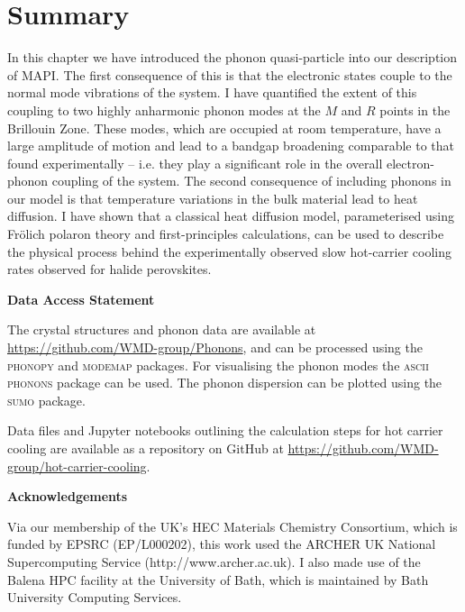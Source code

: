\section{Summary}

In this chapter we have introduced the phonon quasi-particle into our description of MAPI. The first consequence of this is that the electronic states couple to the normal mode vibrations of the system. I have quantified the extent of this coupling to two highly anharmonic phonon modes at the $M$ and $R$ points in the Brillouin Zone. These modes, which are occupied at room temperature, have a large amplitude of motion and lead to a bandgap broadening comparable to that found experimentally -- i.e. they play a significant role in the overall electron-phonon coupling of the system.
The second consequence of including phonons in our model is that temperature variations in the bulk material lead to heat diffusion. I have shown that a classical heat diffusion model, parameterised using Fr\"{o}lich polaron theory and first-principles calculations, can be used to
describe the physical process behind the experimentally observed slow hot-carrier cooling rates
observed for halide perovskites.

\textbf{Data Access Statement}

The crystal structures and phonon data are available at \url{https://github.com/WMD-group/Phonons}, 
and can be processed using the \textsc{phonopy}\autocite{Togo2015} and  \textsc{modemap}\autocite{ModeMap} packages. For visualising the phonon modes the \textsc{ascii phonons} package can be used.\autocite{asciiphonons} The phonon dispersion can be plotted using the \textsc{sumo} package.\autocite{sumo2018}

Data files and Jupyter notebooks outlining the calculation steps for hot carrier cooling are available as a repository on GitHub at \url{https://github.com/WMD-group/hot-carrier-cooling}.

\textbf{Acknowledgements}

Via our membership of the UK's HEC Materials Chemistry Consortium, which is funded by EPSRC (EP/L000202), this work used the ARCHER UK National Supercomputing Service (http://www.archer.ac.uk). I also made use of the Balena HPC facility at the University of Bath, which is maintained by Bath University Computing Services. 


